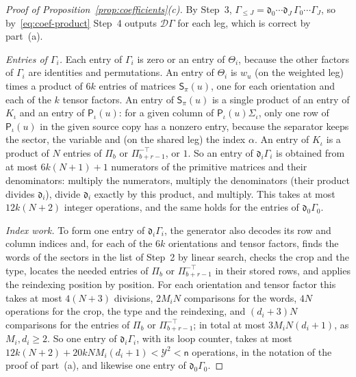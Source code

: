 \begin{proof}[Proof of Proposition~\ref{prop:coefficients}(c)]
By Step~3, \(\Gamma_{\le J}=\mathfrak d_0\cdots\mathfrak d_J\,
\Gamma_0\cdots\Gamma_J\), so by~\eqref{eq:coef-product} Step~4 outputs
\(\mathcal D\Gamma\) for each leg, which is correct by part~(a).

\emph{Entries of \(\Gamma_i\).} Each entry of \(\Gamma_i\) is zero or an
entry of \(\Theta_i\), because the other factors of \(\Gamma_i\) are
identities and permutations. An entry of \(\Theta_i\) is \(w_u\) (on
the weighted leg) times a product of \(6k\) entries of matrices
\(\mathsf S_\pi(u)\), one for each orientation and each of the \(k\) tensor
factors. An entry of \(\mathsf S_\pi(u)\) is a single product of an entry of
\(K_\iota\) and an entry of \(\mathsf P_\iota(u)\): for a given column of
\(\mathsf P_\iota(u)\Sigma_\iota\), only one row of \(\mathsf P_\iota(u)\) in the given
source copy has a nonzero entry, because the separator keeps the sector,
the variable and (on the shared leg) the index \(\alpha\). An entry of
\(K_\iota\) is a product of \(N\) entries of \(\Pi_b\) or
\(\Pi_{b+r-1}^{-\top}\), or \(1\). So an entry of
\(\mathfrak d_i\Gamma_i\) is obtained from at most \(6k(N+1)+1\) numerators
of the primitive matrices and their denominators: multiply the
numerators, multiply the denominators (their product divides
\(\mathfrak d_i\)), divide \(\mathfrak d_i\) exactly by this product, and
multiply. This takes at most \(12k(N+2)\) integer operations, and the
same holds for the entries of \(\mathfrak d_0\Gamma_0\).

\emph{Index work.} To form one entry of \(\mathfrak d_i\Gamma_i\), the
generator also decodes its row and column indices and, for each of the
\(6k\) orientations and tensor factors, finds the words of the sectors in
the list of Step~2 by linear search, checks the crop and the type,
locates the needed entries of \(\Pi_b\) or \(\Pi_{b+r-1}^{-\top}\) in
their stored rows, and applies the reindexing position by position. For
each orientation and tensor factor this takes at most \(4(N+3)\)
divisions, \(2M_iN\) comparisons for the words, \(4N\) operations for the
crop, the type and the reindexing, and \((d_i+3)N\) comparisons for the
entries of \(\Pi_b\) or \(\Pi_{b+r-1}^{-\top}\); in total at most
\(3M_iN(d_i+1)\), as \(M_i,d_i\ge2\). So one entry of
\(\mathfrak d_i\Gamma_i\), with its loop counter, takes at most
\(12k(N+2)+20kNM_i(d_i+1)<\mathcal Y^2<\mathsf n\) operations, in the
notation of the proof of part~(a), and likewise one entry of
\(\mathfrak d_0\Gamma_0\).


\end{proof}
